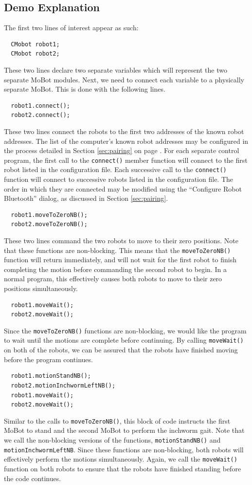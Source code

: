 \documentclass{article}
\begin{document}
\subsection{Demo Explanation}
The first two lines of interest appear as such:
\begin{verbatim}
  CMobot robot1;
  CMobot robot2;
\end{verbatim}
These two lines declare two separate variables which will represent the
two separate MoBot modules. Next, we need to connect each variable to
a physically separate MoBot. This is done with the following lines.
\begin{verbatim}
  robot1.connect();
  robot2.connect();
\end{verbatim}
These two lines connect the robots to the first two addresses
of the known robot addresses. The list of the computer's known
robot addresses may be configured in the process detailed in Section
\ref{sec:pairing} on page \pageref{sec:pairing}. For each separate
control program, the first call to the \texttt{connect()} member
function will connect to the first robot listed in the configuration
file. Each successive call to the \texttt{connect()} function will
connect to successive robots listed in the configuration file. 
The order in which they are connected may be modified using the
``Configure Robot Bluetooth'' dialog, as discussed in Section
\ref{sec:pairing}.

\begin{verbatim}
  robot1.moveToZeroNB();
  robot2.moveToZeroNB();
\end{verbatim}
These two lines command the two robots to move to their zero positions.
Note that these functions are non-blocking. This means that the
\texttt{moveToZeroNB()} function will return immediately, and will not
wait for the first robot to finish completing the motion before 
commanding the second robot to begin. In a normal program, this effectively
causes both robots to move to their zero positions simultaneously.

\begin{verbatim}
  robot1.moveWait();
  robot2.moveWait();
\end{verbatim}
Since the \texttt{moveToZeroNB()} functions are non-blocking, we would like
the program to wait until the motions are complete before continuing. By
calling \texttt{moveWait()} on both of the robots, we can be assured that
the robots have finished moving before the program continues.

\begin{verbatim}
  robot1.motionStandNB();
  robot2.motionInchwormLeftNB();
  robot1.moveWait();
  robot2.moveWait();
\end{verbatim}
Similar to the calls to \texttt{moveToZeroNB()}, this block of code instructs 
the first MoBot to stand and the second MoBot to perform the inchworm gait.
Note that we call the non-blocking versions of the
functions, \texttt{motionStandNB()} and \texttt{motionInchwormLeftNB}. Since these functions are
non-blocking, both robots will effectively perform the motions simultaneously. Again,
we call the \texttt{moveWait()} function on both robots to ensure that 
the robots have finished standing before the code continues.
\end{document}
